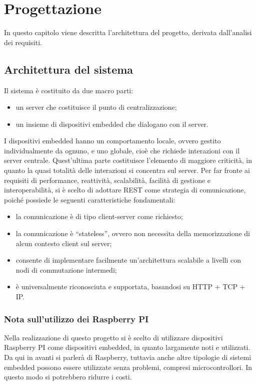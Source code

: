 \chapter{Progettazione}

In questo capitolo viene descritta l'architettura del progetto, derivata dall'analisi dei requisiti.

\section{Architettura del sistema}
Il sistema è costituito da due macro parti:
\begin{itemize}
 \item un server che costituisce il punto di centralizzazione;
 \item un insieme di dispositivi embedded che dialogano con il server.
\end{itemize}
I dispositivi embedded hanno un comportamento locale, ovvero gestito individualmente da ognuno, e uno globale, cioè che richiede interazioni con il server centrale. Quest'ultima parte costituisce l'elemento di maggiore criticità, in quanto la quasi totalità delle interazioni si concentra sul server. Per far fronte ai requisiti di performance, reattività, scalabilità, facilità di gestione e interoperabilità, si è scelto di adottare REST come strategia di comunicazione, poiché possiede le seguenti caratteristiche fondamentali:
\begin{itemize}
 \item la comunicazione è di tipo client-server come richiesto;
 \item la comunicazione è ``stateless'', ovvero non necessita della memorizzazione di alcun contesto client sul server;
 \item consente di implementare facilmente un'architettura scalabile a livelli con nodi di commutazione intermedi;
 \item è universalmente riconosciuta e supportata, basandosi su HTTP + TCP + IP.
\end{itemize}
\subsection{Nota sull'utilizzo dei Raspberry PI}
Nella realizzazione di questo progetto si è scelto di utilizzare dispositivi Raspberry PI come dispositivi embedded, in quanto largamente noti e utilizzati. Da qui in avanti si parlerà di Raspberry, tuttavia anche altre tipologie di sistemi embedded possono essere utilizzate senza problemi, compresi microcontrollori. In questo modo si potrebbero ridurre i costi.


